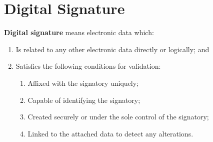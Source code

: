 \section{Digital Signature}

\textbf{Digital signature} means electronic data which:  
\begin{enumerate}[topsep=-0.5em, itemsep=0.5em]
    \item Is related to any other electronic data directly or logically; and
    \item Satisfies the following conditions for validation:
    \begin{enumerate}
        \item Affixed with the signatory uniquely;
        \item Capable of identifying the signatory;
        \item Created securely or under the sole control of the signatory;
        \item Linked to the attached data to detect any alterations.
    \end{enumerate}
\end{enumerate}
